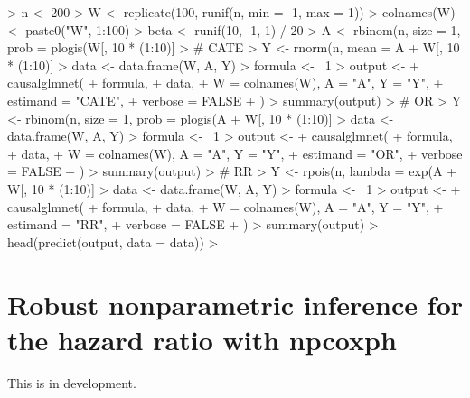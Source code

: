 \documentclass{article}
\begin{document}
\begin{Schunk}
\begin{Sinput}
> n <- 200
> W <- replicate(100, runif(n, min = -1, max = 1))
> colnames(W) <- paste0("W", 1:100)
> beta <- runif(10, -1, 1) / 20
> A <- rbinom(n, size = 1, prob = plogis(W[, 10 * (1:10)] %*% beta))
> # CATE
> Y <- rnorm(n, mean = A + W[, 10 * (1:10)] %*% beta, sd = 0.5)
> data <- data.frame(W, A, Y)
> formula <- ~1
> output <-
+   causalglmnet(
+     formula,
+     data,
+     W = colnames(W), A = "A", Y = "Y",
+     estimand = "CATE",
+     verbose = FALSE
+   )
> summary(output)
> # OR
> Y <- rbinom(n, size = 1, prob = plogis(A + W[, 10 * (1:10)] %*% beta))
> data <- data.frame(W, A, Y)
> formula <- ~1
> output <-
+   causalglmnet(
+     formula,
+     data,
+     W = colnames(W), A = "A", Y = "Y",
+     estimand = "OR",
+     verbose = FALSE
+   )
> summary(output)
> # RR
> Y <- rpois(n, lambda = exp(A + W[, 10 * (1:10)] %*% beta))
> data <- data.frame(W, A, Y)
> formula <- ~1
> output <-
+   causalglmnet(
+     formula,
+     data,
+     W = colnames(W), A = "A", Y = "Y",
+     estimand = "RR",
+     verbose = FALSE
+   )
> summary(output)
> head(predict(output, data = data))
> 
\end{Sinput}
\end{Schunk}



\section{Robust nonparametric inference for the hazard ratio with npcoxph}
This is in development. \nocite{vanderLaanetal2007}



\end{document}
